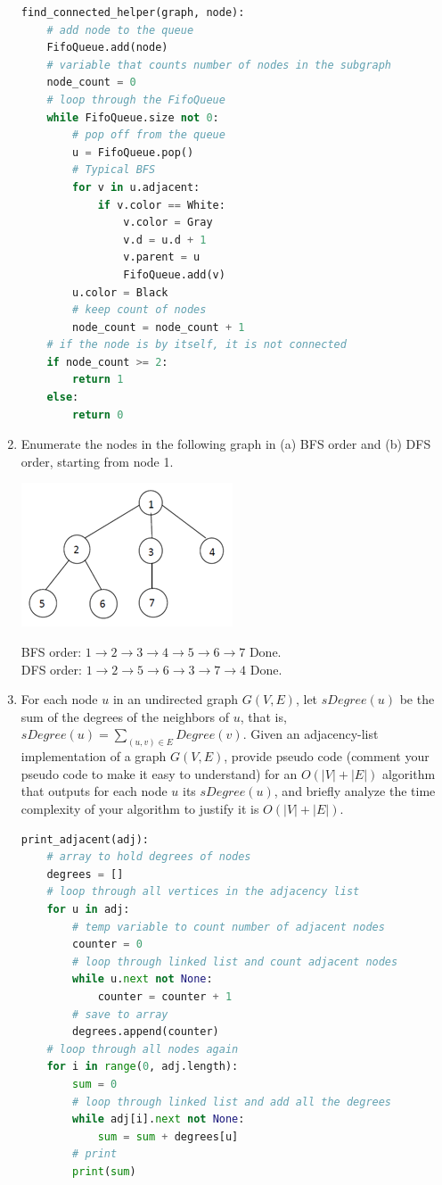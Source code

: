 \documentclass{article}
\begin{document}
\begin{enumerate}
\begin{lstlisting}[language=python]
find_connected_helper(graph, node):
    # add node to the queue
    FifoQueue.add(node)
    # variable that counts number of nodes in the subgraph
    node_count = 0
    # loop through the FifoQueue
    while FifoQueue.size not 0:
        # pop off from the queue
        u = FifoQueue.pop()
        # Typical BFS 
        for v in u.adjacent:
            if v.color == White:
                v.color = Gray
                v.d = u.d + 1
                v.parent = u
                FifoQueue.add(v)
        u.color = Black
        # keep count of nodes
        node_count = node_count + 1
    # if the node is by itself, it is not connected
    if node_count >= 2:
        return 1
    else:
        return 0
            \end{lstlisting}
        \item Enumerate the nodes in the following graph in (a) BFS order and 
        (b) DFS order, starting from node 1. 
            \begin{center}
                \includegraphics{tree1}
            \end{center}
            BFS order: $1 \rightarrow 2 \rightarrow 3 \rightarrow 4 \rightarrow 5 \rightarrow 6 \rightarrow 7$ Done.\\
            DFS order: $1 \rightarrow 2 \rightarrow 5 \rightarrow 6 \rightarrow 3 \rightarrow 7 \rightarrow 4$ Done.
        \item For each node $u$ in an undirected graph $G(V, E)$, let 
        $sDegree(u)$ be the sum of the degrees of the neighbors of $u$, that 
        is, $sDegree(u) = \sum_{(u,v)\in E}Degree(v)$. Given an adjacency-list 
        implementation of a graph $G(V, E)$, provide pseudo code (comment your 
        pseudo code to make it easy to understand) for an $O(|V|+|E|)$ 
        algorithm that outputs for each node $u$ its $sDegree(u)$, and briefly 
        analyze the time complexity of your algorithm to justify it is 
        $O(|V|+|E|)$.
            \begin{lstlisting}[language=python]
print_adjacent(adj):
    # array to hold degrees of nodes
    degrees = []
    # loop through all vertices in the adjacency list
    for u in adj:
        # temp variable to count number of adjacent nodes
        counter = 0
        # loop through linked list and count adjacent nodes
        while u.next not None:
            counter = counter + 1
        # save to array
        degrees.append(counter)
    # loop through all nodes again
    for i in range(0, adj.length):
        sum = 0
        # loop through linked list and add all the degrees
        while adj[i].next not None:
            sum = sum + degrees[u]
        # print
        print(sum)
            \end{lstlisting}


\end{enumerate}
\end{document}
